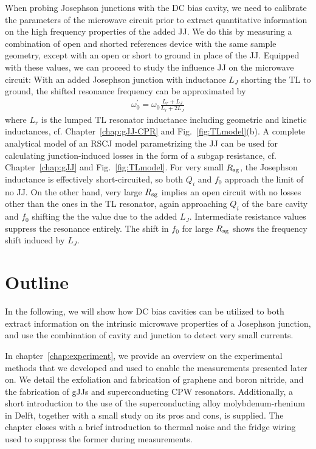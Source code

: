 When probing Josephson junctions with the DC bias cavity, we need to calibrate the parameters of the microwave circuit prior to extract quantitative information on the high frequency properties of the added JJ.
%
We do this by measuring a combination of open and shorted references device with the same sample geometry, except with an open or short to ground in place of the JJ.
%
Equipped with these values, we can proceed to study the influence JJ on the microwave circuit:
%
With an added Josephson junction with inductance $L_J$ shorting the TL to ground, the shifted resonance frequency can be approximated by
%
\begin{align}
\omega_0^\prime = \omega_0\frac{L_r+L_J}{L_r+2L_J}
\label{eq:intro-omega0p}
\end{align}
%
where $L_r$ is the lumped TL resonator inductance including geometric and kinetic inductances, cf. Chapter~\ref{chap:gJJ-CPR} and Fig.~\ref{fig:TLmodel}(b).
%
A complete analytical model of an RSCJ model parametrizing the JJ can be used for calculating junction-induced losses in the form of a subgap resistance, cf. Chapter~\ref{chap:gJJ} and Fig.~\ref{fig:TLmodel}.
%
For very small $R_{\rm sg}$, the Josephson inductance is effectively short-circuited, so both $Q_i$ and $f_0$ approach the limit of no JJ.
%
On the other hand, very large $R_{\rm sg}$ implies an open circuit with no losses other than the ones in the TL resonator, again approaching $Q_i$ of the bare cavity and $f_0$ shifting the the value due to the added $L_J$.
%
Intermediate resistance values suppress the resonance entirely.
%
The shift in $f_0$ for large $R_{\rm sg}$ shows the frequency shift induced by $L_J$.



\section{Outline}

In the following, we will show how DC bias cavities can be utilized to both extract information on the intrinsic microwave properties of a Josephson junction, and use the combination of cavity and junction to detect very small currents.

In chapter~\ref{chap:experiment}, we provide an overview on the experimental methods that we developed and used to enable the measurements presented later on.
%
We detail the exfoliation and fabrication of graphene and boron nitride, and the fabrication of gJJs and superconducting CPW resonators.
%
Additionally, a short introduction to the use of the superconducting alloy molybdenum-rhenium in Delft, together with a small study on its pros and cons, is supplied.
%
The chapter closes with a brief introduction to thermal noise and the fridge wiring used to suppress the former during measurements.

